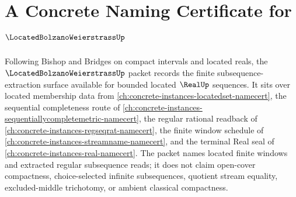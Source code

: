 \chapter{A Concrete Naming Certificate for $\LocatedBolzanoWeierstrassUp$}
\label{ch:concrete-instances-located-bolzano-weierstrass-namecert}

Following Bishop and Bridges on compact intervals and located reals, the $\LocatedBolzanoWeierstrassUp$ packet records the finite subsequence-extraction surface available for bounded located $\RealUp$ sequences. It sits over located membership data from \autoref{ch:concrete-instances-locatedset-namecert}, the sequential completeness route of \autoref{ch:concrete-instances-sequentiallycompletemetric-namecert}, the regular rational readback of \autoref{ch:concrete-instances-regseqrat-namecert}, the finite window schedule of \autoref{ch:concrete-instances-streamname-namecert}, and the terminal Real seal of \autoref{ch:concrete-instances-real-namecert}. The packet names located finite windows and extracted regular subsequence reads; it does not claim open-cover compactness, choice-selected infinite subsequences, quotient stream equality, excluded-middle trichotomy, or ambient classical compactness.

